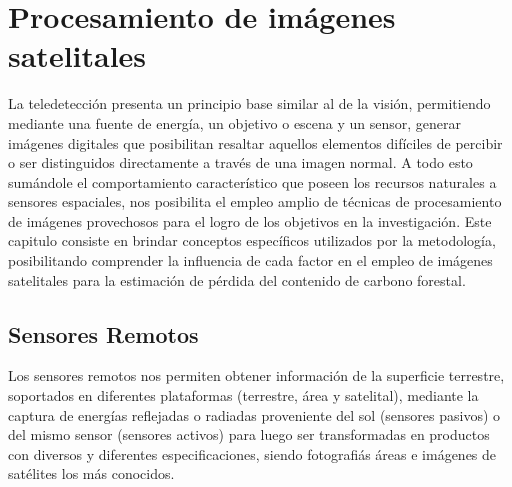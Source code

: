 
\newpage{\ } 
\thispagestyle{empty} 

\chapter{Procesamiento de im\'agenes satelitales}
La teledetecci\'on presenta un principio base similar al de la visi\'on, permitiendo mediante una fuente de energ\'ia, un objetivo o escena y un sensor, generar im\'agenes digitales que posibilitan resaltar aquellos elementos dif\'iciles de percibir o ser distinguidos directamente a trav\'es de una imagen normal. A todo esto sum\'andole el comportamiento caracter\'istico que poseen los recursos naturales a sensores espaciales, nos posibilita el empleo amplio de t\'ecnicas de procesamiento de im\'agenes provechosos para el logro de los objetivos en la investigaci\'on. Este capitulo consiste en brindar conceptos espec\'ificos utilizados por la metodolog\'ia, posibilitando comprender la influencia de cada factor en el empleo de im\'agenes satelitales para la estimaci\'on de p\'erdida del contenido de carbono forestal.

\section{Sensores Remotos}
Los sensores remotos nos permiten obtener informaci\'on de la superficie terrestre, soportados en diferentes plataformas (terrestre, \'area y satelital), mediante la captura de energ\'ias reflejadas o radiadas proveniente del sol (sensores pasivos) o del mismo sensor (sensores activos) para luego ser transformadas en productos con diversos y diferentes especificaciones, siendo fotografi\'as \'areas e im\'agenes de sat\'elites los m\'as conocidos.

